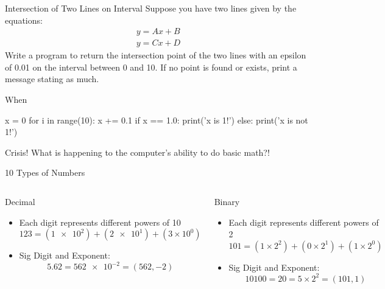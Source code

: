 \documentclass[pdf, aspectratio=169, 12pt]{beamer}
\begin{document}
\begin{frame}{Intersection of Two Lines on Interval}
	Suppose you have two lines given by the equations:
	\begin{align*}
		y = Ax + B \\
		y = Cx + D
	\end{align*}
	Write a program to return the intersection point of the two lines with an epsilon of 0.01 on the interval between 0 and 10. If no point is found or exists, print a message stating as much.
\end{frame}

\begin{frame}[fragile]{When }
	\begin{pythoncode}
		x = 0
		for i in range(10):
			x += 0.1
		if x == 1.0:
			print('x is 1!')
		else:
			print('x is not 1!')
	\end{pythoncode}
	\pause
	\begin{alertblock}{Crisis!}
		What is happening to the computer's ability to do basic math?!
	\end{alertblock}
\end{frame}

\begin{frame}{10 Types of Numbers}
	\begin{columns}
		\begin{block}{Decimal}
			\begin{itemize}
				\item Each digit represents different powers of 10
					{\footnotesize
						\[123 = (\num{1e2}) + (\num{2e1}) + (3\times10^0)\]
					}
				\item Sig Digit and Exponent:
					{\footnotesize
						\[5.62 = \num{562e-2} = (562, -2) \]
					}
			\end{itemize}
		\end{block}
		\begin{block}{Binary}
			\begin{itemize}
				\item Each digit represents different powers of 2
					{\footnotesize
						\[101 = (1\times2^2) + (0\times2^1) + (1\times2^0)\]
					}
				\item Sig Digit and Exponent:
					{\footnotesize
						\[10100 = 20 = 5\times2^2 = (101,1)\]
					}
			\end{itemize}
		\end{block}
	\end{columns}
\end{frame}
\end{document}
